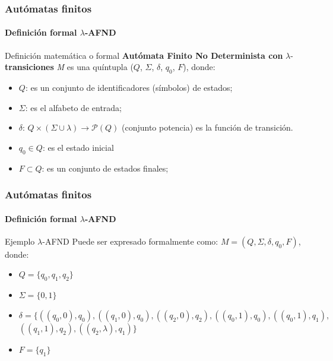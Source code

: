 \documentclass{beamer}
\begin{document}
        \begin{frame}
			\frametitle{Aut\'omatas finitos}
			\framesubtitle{Definici\'on formal $\lambda$-AFND}

            \begin{block}{Definici\'on matem\'atica o formal}
                \textbf{Aut\'omata Finito No Determinista con} $\lambda$-\textbf{transiciones} \emph{M} es una qu\'intupla ($Q$, $\Sigma$, $\delta$, $q_{0}$, $F$), donde:
                \begin{itemize}
                    \item[] $Q$: es un conjunto de identificadores (s\'imbolos) de estados;
                    \item[] $\Sigma$: es el alfabeto de entrada;
                    \item[] $\delta$: $Q \times (\Sigma \cup \lambda) \rightarrow \mathcal{P}(Q)$ (conjunto potencia) es la funci\'on de transici\'on.
                    \item[] $q_{0} \in Q$: es el estado inicial
                    \item[] $F \subset Q$: es un conjunto de estados finales;
                \end{itemize}
            \end{block}
		\end{frame}

        \begin{frame}
			\frametitle{Aut\'omatas finitos}
			\framesubtitle{Definici\'on formal $\lambda$-AFND}

            \begin{exampleblock}{Ejemplo $\lambda$-AFND}
               Puede ser expresado formalmente como: $M = (Q, \Sigma, \delta, q_{0}, F)$, donde:
               \begin{itemize}
                   \item[] $Q = \{q_{0},q_{1},q_{2}\}$
                   \item[] $\Sigma = \{0,1\}$
                   \item[] $\delta =  \{((q_{0}, 0),q_{0}),((q_{1}, 0),q_{0}),((q_{2}, 0),q_{2}),((q_{0}, 1),q_{0}),((q_{0}, 1),q_{1}),$ $((q_{1}, 1),q_{2}),((q_{2}, \lambda), q_{1})\}$
                   \item[] $F = \{q_{1}\}$
               \end{itemize}
            \end{exampleblock}
		\end{frame}
\end{document}
